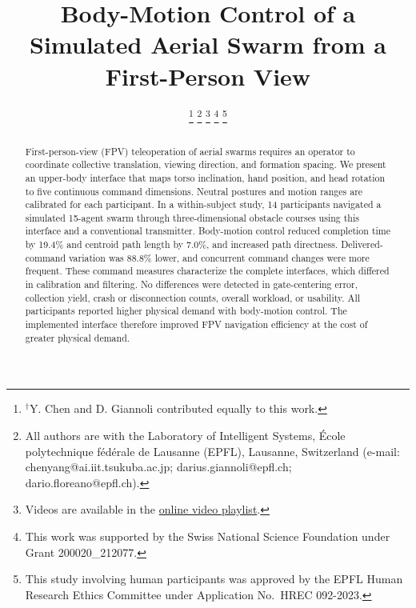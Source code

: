 \documentclass[a4paper,10pt,conference]{ieeeconf}
\title{\LARGE \bf
Body-Motion Control of a Simulated Aerial Swarm from a First-Person View}
\author{
\authorblockN{
Yang Chen$^{\dagger}$,
Darius Giannoli$^{\dagger}$, and
Dario Floreano,
\IEEEmembership{Fellow, IEEE}
}
\thanks{$^{\dagger}$Y. Chen and D. Giannoli contributed equally to this work.}%
\thanks{All authors are with the Laboratory of Intelligent Systems,
\'{E}cole polytechnique f\'{e}d\'{e}rale de Lausanne (EPFL),
Lausanne, Switzerland (e-mail: chenyang@ai.iit.tsukuba.ac.jp;
darius.giannoli@epfl.ch; dario.floreano@epfl.ch).}%
\thanks{Videos are available in the
\protect\href{https://www.youtube.com/playlist?list=PLTn4QPxGFMEU}
{online video playlist}.}%
\thanks{This work was supported by the Swiss National Science Foundation
under Grant 200020\_212077.}%
\thanks{This study involving human participants was approved by the EPFL
Human Research Ethics Committee under Application No.\ HREC 092-2023.}%
}
\begin{document}
\maketitle
\thispagestyle{empty}
\pagestyle{empty}


\begin{abstract}

First-person-view (FPV) teleoperation of aerial swarms requires an operator to coordinate collective translation, viewing direction, and formation spacing. We present an upper-body interface that maps torso inclination, hand position, and head rotation to five continuous command dimensions. Neutral postures and motion ranges are calibrated for each participant. In a within-subject study, 14 participants navigated a simulated 15-agent swarm through three-dimensional obstacle courses using this interface and a conventional transmitter. Body-motion control reduced completion time by 19.4\% and centroid path length by 7.0\%, and increased path directness. Delivered-command variation was 88.8\% lower, and concurrent command changes were more frequent. These command measures characterize the complete interfaces, which differed in calibration and filtering. No differences were detected in gate-centering error, collection yield, crash or disconnection counts, overall workload, or usability. All participants reported higher physical demand with body-motion control. The implemented interface therefore improved FPV navigation efficiency at the cost of greater physical demand.

\end{abstract}
\end{document}
